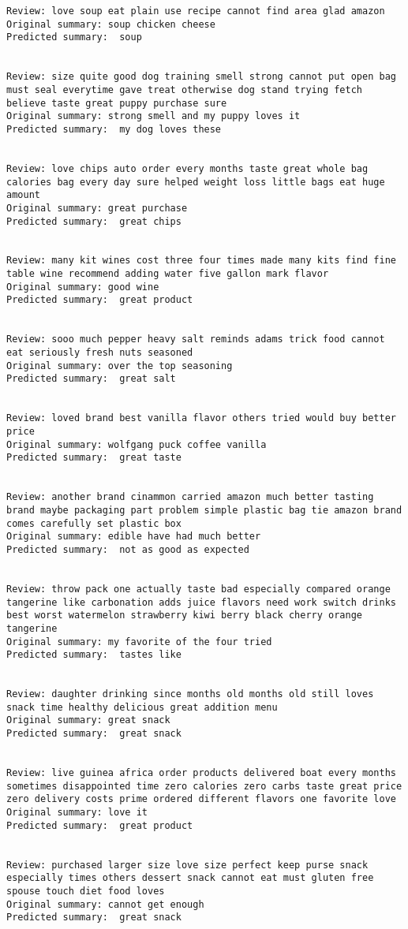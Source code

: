 \documentclass[11pt]{article}
\begin{document}
\begin{Verbatim}[commandchars=\\\{\}]
Review: love soup eat plain use recipe cannot find area glad amazon 
Original summary: soup chicken cheese 
Predicted summary:  soup


Review: size quite good dog training smell strong cannot put open bag must seal everytime gave treat otherwise dog stand trying fetch believe taste great puppy purchase sure 
Original summary: strong smell and my puppy loves it 
Predicted summary:  my dog loves these


Review: love chips auto order every months taste great whole bag calories bag every day sure helped weight loss little bags eat huge amount 
Original summary: great purchase 
Predicted summary:  great chips


Review: many kit wines cost three four times made many kits find fine table wine recommend adding water five gallon mark flavor 
Original summary: good wine 
Predicted summary:  great product


Review: sooo much pepper heavy salt reminds adams trick food cannot eat seriously fresh nuts seasoned 
Original summary: over the top seasoning 
Predicted summary:  great salt


Review: loved brand best vanilla flavor others tried would buy better price 
Original summary: wolfgang puck coffee vanilla 
Predicted summary:  great taste


Review: another brand cinammon carried amazon much better tasting brand maybe packaging part problem simple plastic bag tie amazon brand comes carefully set plastic box 
Original summary: edible have had much better 
Predicted summary:  not as good as expected


Review: throw pack one actually taste bad especially compared orange tangerine like carbonation adds juice flavors need work switch drinks best worst watermelon strawberry kiwi berry black cherry orange tangerine 
Original summary: my favorite of the four tried 
Predicted summary:  tastes like


Review: daughter drinking since months old months old still loves snack time healthy delicious great addition menu 
Original summary: great snack 
Predicted summary:  great snack


Review: live guinea africa order products delivered boat every months sometimes disappointed time zero calories zero carbs taste great price zero delivery costs prime ordered different flavors one favorite love 
Original summary: love it 
Predicted summary:  great product


Review: purchased larger size love size perfect keep purse snack especially times others dessert snack cannot eat must gluten free spouse touch diet food loves 
Original summary: cannot get enough 
Predicted summary:  great snack



\end{Verbatim}
\end{document}

